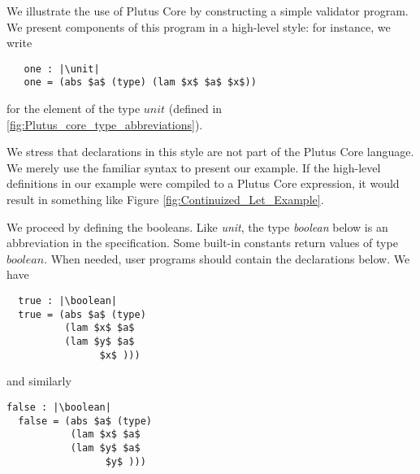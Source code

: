 \documentclass[../plutus-core-specification.tex]{subfiles}
\begin{document}
\newcommand\unit{$\mathit{unit}$}
\newcommand\boolean{$\mathit{boolean}$}
\newcommand\signed{$\mathit{signed}$}
\newcommand\txhash{$\mathit{txhash}$}
\newcommand\pubkey{$\mathit{pubkey}$}
\newcommand\blocknum{$\mathit{blocknum}$}


We illustrate the use of Plutus Core by constructing a simple
validator program. We present components of this program in a
high-level style: for instance, we write
\begin{lstlisting}
   one : |\unit|
   one = (abs $a$ (type) (lam $x$ $a$ $x$))
\end{lstlisting}
for the element of the type $unit$ (defined in \ref{fig:Plutus_core_type_abbreviations}).

We stress that declarations in this style are not part of the Plutus
Core language. We merely use the familiar syntax to present our
example. If the high-level definitions in our example were compiled to
a Plutus Core expression, it would result in something like Figure
\ref{fig:Continuized_Let_Example}.

We proceed by defining the booleans. Like \textit{unit}, the type \textit{boolean}
below is an abbreviation in the specification. Some built-in constants
return values of type $boolean$. When needed, user programs should
contain the declarations below. We have


\begin{lstlisting}
  true : |\boolean|
  true = (abs $a$ (type)
          (lam $x$ $a$
          (lam $y$ $a$
                $x$ )))
\end{lstlisting}
and similarly
\begin{lstlisting}[basicstyle=\ttfamily,mathescape]
  false : |\boolean|
  false = (abs $a$ (type)
           (lam $x$ $a$
           (lam $y$ $a$
                 $y$ )))
\end{lstlisting}
\end{document}
